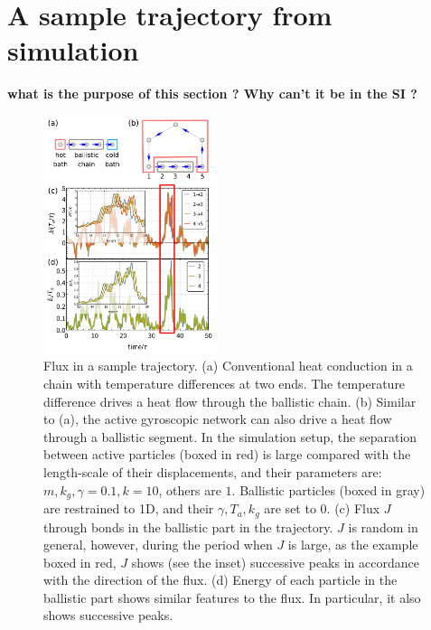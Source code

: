 \documentclass[
 preprint,
 preprintnumbers,
 amsmath,amssymb,
 aps,
 pre,
 longbibliography,
 10pt, twocolumn
]{revtex4-1}
\begin{document}
\section{A sample trajectory from simulation} \label{sec:simulation}
{\bf what is the purpose of this section ? Why can't it be in the SI ? }
\begin{figure}[ht]
	\centering
	\includegraphics[width=0.45\textwidth]{6_simulation.pdf}
    \caption{Flux in a sample trajectory.
    (a) Conventional heat conduction in a chain with temperature differences at two ends. The temperature difference drives a heat flow through the ballistic chain.
    (b) Similar to (a), the active gyroscopic network can also drive a heat flow through a ballistic segment. In the simulation setup, the separation between active particles (boxed in red) is large compared with the length-scale of their displacements, and their parameters are: $m,k_g,\gamma=0.1, k=10$, others are $1$. Ballistic particles (boxed in gray) are restrained to 1D, and their $\gamma,T_a,k_g$ are set to $0$.
    (c) Flux $J$ through bonds in the ballistic part in the trajectory. $J$ is random in general, however, during the period when $J$ is large, as the example boxed in red, $J$ shows (see the inset) successive peaks in accordance with the direction of the flux.
    (d) Energy of each particle in the ballistic part shows similar features to the flux. In particular, it also shows successive peaks.
    }
    \label{fig:simulation}
\end{figure}
\end{document}

